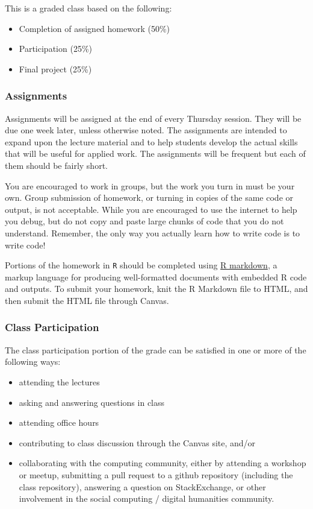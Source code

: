 \documentclass[]{book}
\providecommand{\tightlist}{%
  \setlength{\itemsep}{0pt}\setlength{\parskip}{0pt}}
\begin{document}
This is a graded class based on the following:

\begin{itemize}
\tightlist
\item
  Completion of assigned homework (50\%)
\item
  Participation (25\%)
\item
  Final project (25\%)
\end{itemize}

\subsubsection*{Assignments}\label{assignments}

Assignments will be assigned at the end of every Thursday session. They
will be due one week later, unless otherwise noted. The assignments are
intended to expand upon the lecture material and to help students
develop the actual skills that will be useful for applied work. The
assignments will be frequent but each of them should be fairly short.

You are encouraged to work in groups, but the work you turn in must be
your own. Group submission of homework, or turning in copies of the same
code or output, is not acceptable. While you are encouraged to use the
internet to help you debug, but do not copy and paste large chunks of
code that you do not understand. Remember, the only way you actually
learn how to write code is to write code!

Portions of the homework in \texttt{R} should be completed using
\href{https://rmarkdown.rstudio.com/}{R markdown}, a markup language for
producing well-formatted documents with embedded R code and outputs. To
submit your homework, knit the R Markdown file to HTML, and then submit
the HTML file through Canvas.

\subsubsection*{Class Participation}\label{class-participation}

The class participation portion of the grade can be satisfied in one or
more of the following ways:

\begin{itemize}
\tightlist
\item
  attending the lectures
\item
  asking and answering questions in class
\item
  attending office hours
\item
  contributing to class discussion through the Canvas site, and/or
\item
  collaborating with the computing community, either by attending a
  workshop or meetup, submitting a pull request to a github repository
  (including the class repository), answering a question on
  StackExchange, or other involvement in the social computing / digital
  humanities community.
\end{itemize}
\end{document}
